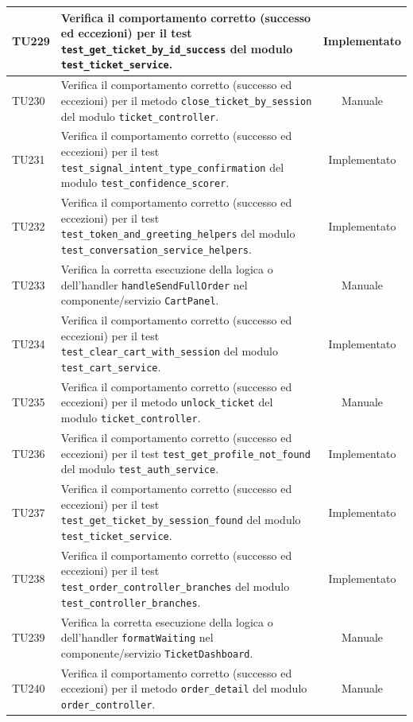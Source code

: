 \documentclass[a4paper,11pt,oneside]{scrartcl}
\begin{document}
\begin{longtable}{|p{1.9cm}|p{11.6cm}|c|}
    TU229 & Verifica il comportamento corretto (successo ed eccezioni) per il test \texttt{test\_get\_ticket\_by\_id\_success} del modulo \texttt{test\_ticket\_service}. & Implementato \\ \hline
    TU230 & Verifica il comportamento corretto (successo ed eccezioni) per il metodo \texttt{close\_ticket\_by\_session} del modulo \texttt{ticket\_controller}. & Manuale \\ \hline
    TU231 & Verifica il comportamento corretto (successo ed eccezioni) per il test \texttt{test\_signal\_intent\_type\_confirmation} del modulo \texttt{test\_confidence\_scorer}. & Implementato \\ \hline
    TU232 & Verifica il comportamento corretto (successo ed eccezioni) per il test \texttt{test\_token\_and\_greeting\_helpers} del modulo \texttt{test\_conversation\_service\_helpers}. & Implementato \\ \hline
    TU233 & Verifica la corretta esecuzione della logica o dell'handler \texttt{handleSendFullOrder} nel componente/servizio \texttt{CartPanel}. & Manuale \\ \hline
    TU234 & Verifica il comportamento corretto (successo ed eccezioni) per il test \texttt{test\_clear\_cart\_with\_session} del modulo \texttt{test\_cart\_service}. & Implementato \\ \hline
    TU235 & Verifica il comportamento corretto (successo ed eccezioni) per il metodo \texttt{unlock\_ticket} del modulo \texttt{ticket\_controller}. & Manuale \\ \hline
    TU236 & Verifica il comportamento corretto (successo ed eccezioni) per il test \texttt{test\_get\_profile\_not\_found} del modulo \texttt{test\_auth\_service}. & Implementato \\ \hline
    TU237 & Verifica il comportamento corretto (successo ed eccezioni) per il test \texttt{test\_get\_ticket\_by\_session\_found} del modulo \texttt{test\_ticket\_service}. & Implementato \\ \hline
    TU238 & Verifica il comportamento corretto (successo ed eccezioni) per il test \texttt{test\_order\_controller\_branches} del modulo \texttt{test\_controller\_branches}. & Implementato \\ \hline
    TU239 & Verifica la corretta esecuzione della logica o dell'handler \texttt{formatWaiting} nel componente/servizio \texttt{TicketDashboard}. & Manuale \\ \hline
    TU240 & Verifica il comportamento corretto (successo ed eccezioni) per il metodo \texttt{order\_detail} del modulo \texttt{order\_controller}. & Manuale \\ \hline

\end{longtable}
\end{document}
